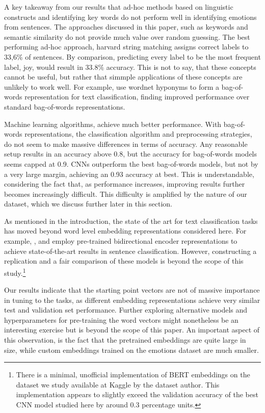 \documentclass[conference]{IEEEtran}
\begin{document}
A key takeaway from our results that ad-hoc methods based on linguistic constructs and identifying key words do not perform well in identifying emotions from sentences. The approaches discussed in this paper, such as keywords and semantic similarity do not provide much value over random guessing. The best performing ad-hoc approach, harvard string matching assigns correct labels to 33,6\% of sentences. By comparison, predicting every label to be the most frequent label, joy, would result in 33.8\% accuracy.  This is not to say, that these concepts cannot be useful, but rather that simmple applications of these concepts are unlikely to work well. For example, \cite{scott-matwin-1998-text} use wordnet hyponyms to form a bag-of-words representation for text classification, finding improved performance over standard bag-of-words representations.

Machine learning algorithms, achieve much better performance. With bag-of-words representations, the classification algorithm and preprocessing strategies, do not seem to make massive differences in terms of accuracy. Any reasonable setup results in an accuracy above 0.8, but the accuracy for bag-of-words models seems capped at 0.9. CNNs outperform the best bag-of-words models, but not by a very large margin,  achieving an 0.93 accuracy at best. This is understandable, considering the fact that, as performance increases, improving results further becomes increasingly difficult. This difficulty is amplified by the nature of our dataset, which we discuss further later in this section.

As mentioned in the introduction, the state of the art for text classification tasks has moved beyond word level embedding representations considered here. For example, \cite{bert}, \cite{xlnet} and \cite{bertclassification} employ pre-trained bidirectional encoder representations to achieve state-of-the-art results in sentence classification. However, constructing a replication and a fair comparison of these models is beyond the scope of this study.\footnote{There is a minimal, unofficial implementation of BERT\cite{bert} embeddings on the dataset we study\cite{kaggledata} available at Kaggle by the dataset author. This implementation appears to slightly exceed the validation accuracy of the best CNN model studied here by around 0.3 percentage units.}

Our results indicate that the starting point vectors are not of massive importance in tuning to the tasks, as different embedding representations achieve very similar test and validation set performance. Further exploring alternative models and hyperparameters for pre-training the word vectors might nonetheless be an interesting exercise but is beyond the scope of this paper. An important aspect of this observation, is the fact that the pretrained embeddings are quite large in size, while custom embeddings trained on the emotions dataset are much smaller.
\end{document}
